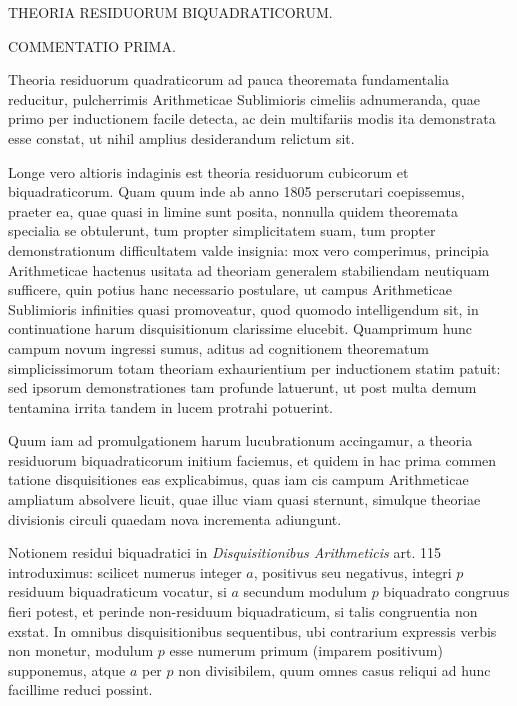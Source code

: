 %
\begin{center}
{\large THEORIA RESIDUORUM BIQUADRATICORUM.\par}
\bigskip COMMENTATIO PRIMA.
\end{center}
\BookRule{28mm}

Theoria residuorum quadraticorum ad pauca theoremata fundamentalia reducitur, pulcherrimis Arithmeticae Sublimioris cimeliis adnumeranda, quae primo per inductionem facile detecta, ac dein multifariis modis ita demonstrata esse constat, ut nihil amplius desiderandum relictum sit.

Longe vero altioris indaginis est theoria residuorum cubicorum et biquadraticorum. Quam quum inde ab anno 1805 perscrutari coepissemus, praeter ea, quae quasi in limine sunt posita, nonnulla quidem theoremata specialia se obtulerunt, tum propter simplicitatem suam, tum propter demonstrationum difficultatem valde insignia: mox vero comperimus, principia Arithmeticae hactenus usitata ad theoriam generalem stabiliendam neutiquam sufficere, quin potius hanc necessario postulare, ut campus Arithmeticae Sublimioris infinities quasi promoveatur, quod quomodo intelligendum sit, in continuatione harum disquisitionum clarissime elucebit. Quamprimum hunc campum novum ingressi sumus, aditus ad cognitionem theorematum simplicissimorum totam theoriam exhaurientium per inductionem statim patuit: sed ipsorum demonstrationes tam profunde latuerunt, ut post multa demum tentamina irrita tandem in lucem protrahi potuerint.

Quum iam ad promulgationem harum lucubrationum accingamur, a theoria residuorum biquadraticorum initium faciemus, et quidem in hac prima commen%
%
tatione disquisitiones eas explicabimus, quas iam cis campum Arithmeticae ampliatum absolvere licuit, quae illuc viam quasi sternunt, simulque theoriae divisionis circuli quaedam nova incrementa adiungunt.

Notionem residui biquadratici in \emph{Disquisitionibus Arithmeticis} art. 115 introduximus: scilicet numerus integer $a$, positivus seu negativus, integri $p$ residuum biquadraticum vocatur, si $a$ secundum modulum $p$ biquadrato congruus fieri potest, et perinde non-residuum biquadraticum, si talis congruentia non exstat. In omnibus disquisitionibus sequentibus, ubi contrarium expressis verbis non monetur, modulum $p$ esse numerum primum (imparem positivum) supponemus, atque $a$ per $p$ non divisibilem, quum omnes casus reliqui ad hunc facillime reduci possint.

